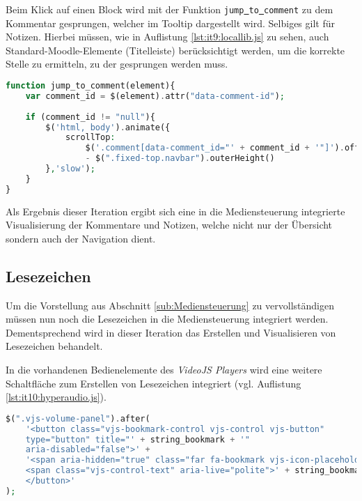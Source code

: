 Beim Klick auf einen Block wird mit der Funktion \texttt{jump\underline{{ }}to\underline{{ }}comment} zu dem Kommentar gesprungen, welcher im Tooltip dargestellt wird. Selbiges gilt für Notizen. Hierbei müssen, wie in Auflistung \ref{lst:it9:locallib.js} zu sehen, auch Standard-Moodle-Elemente (Titelleiste) berücksichtigt werden, um die korrekte Stelle zu ermitteln, zu der gesprungen werden muss.

\begin{lstlisting}[language=php,
             linewidth=\textwidth,
             caption={Ausschnitt der \textbf{locallib.js} in der 9. Iteration},
             label={lst:it9:locallib.js}]
function jump_to_comment(element){
    var comment_id = $(element).attr("data-comment-id");
	
    if (comment_id != "null"){
        $('html, body').animate({
            scrollTop:
                $('.comment[data-comment_id="' + comment_id + '"]').offset().top
                - $(".fixed-top.navbar").outerHeight()
        },'slow');
    }
}
\end{lstlisting}
Als Ergebnis dieser Iteration ergibt sich eine in die Mediensteuerung integrierte Visualisierung der Kommentare und Notizen, welche nicht nur der Übersicht sondern auch der Navigation dient.

\subsection{Lesezeichen}
Um die Vorstellung aus Abschnitt \ref{sub:Mediensteuerung} zu vervollständigen müssen nun noch die Lesezeichen in die Mediensteuerung integriert werden. Dementsprechend wird in dieser Iteration das Erstellen und Visualisieren von Lesezeichen behandelt.

In die vorhandenen Bedienelemente des \textit{VideoJS Players} wird eine weitere Schaltfläche zum Erstellen von Lesezeichen integriert (vgl. Auflistung \ref{lst:it10:hyperaudio.js}).

\begin{lstlisting}[language=php,
             linewidth=\textwidth,
             caption={Ausschnitt der \textbf{hyperaudio.js} in der 10. Iteration},
             label={lst:it10:hyperaudio.js}]
$(".vjs-volume-panel").after(
    '<button class="vjs-bookmark-control vjs-control vjs-button"
    type="button" title="' + string_bookmark + '"
    aria-disabled="false">' +
    '<span aria-hidden="true" class="far fa-bookmark vjs-icon-placeholder"></span>
    <span class="vjs-control-text" aria-live="polite">' + string_bookmark + '</span>
    </button>'
);
\end{lstlisting}

